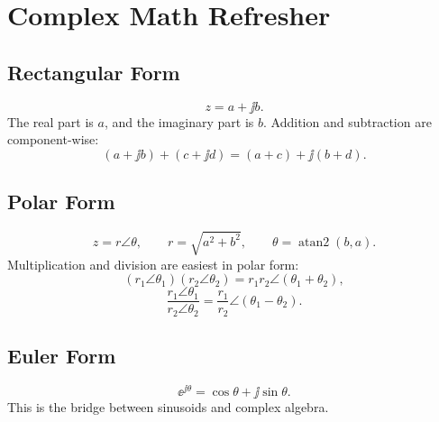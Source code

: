 \chapter{Complex Math Refresher}
\section{Rectangular Form}
\[
z=a+\jj b.
\]
The real part is \(a\), and the imaginary part is \(b\). Addition and
subtraction are component-wise:
\[
(a+\jj b)+(c+\jj d)=(a+c)+\jj(b+d).
\]

\section{Polar Form}
\[
z=r\angle\theta,
\qquad
r=\sqrt{a^2+b^2},
\qquad
\theta=\operatorname{atan2}(b,a).
\]
Multiplication and division are easiest in polar form:
\[
(r_1\angle\theta_1)(r_2\angle\theta_2)
=r_1r_2\angle(\theta_1+\theta_2),
\]
\[
\frac{r_1\angle\theta_1}{r_2\angle\theta_2}
=\frac{r_1}{r_2}\angle(\theta_1-\theta_2).
\]

\section{Euler Form}
\[
\ee^{\jj\theta}=\cos\theta+\jj\sin\theta.
\]
This is the bridge between sinusoids and complex algebra.
